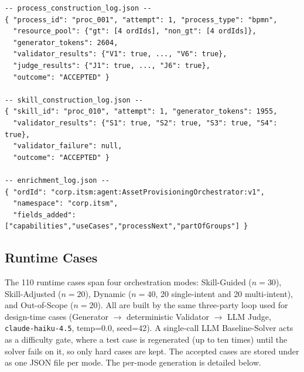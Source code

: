 \begin{lstlisting}[float=!t, floatplacement=!t, basicstyle=\ttfamily\scriptsize, breaklines=true, frame=single, label={lst:construction-logs}, caption={One representative entry from each of the three design-time construction logs. The skill and process logs record per-attempt validator results and acceptance outcome; the enrichment log records which fields were written per resource.}]
-- process_construction_log.json --
{ "process_id": "proc_001", "attempt": 1, "process_type": "bpmn",
  "resource_pool": {"gt": [4 ordIds], "non_gt": [4 ordIds]},
  "generator_tokens": 2604,
  "validator_results": {"V1": true, ..., "V6": true},
  "judge_results": {"J1": true, ..., "J6": true},
  "outcome": "ACCEPTED" }

-- skill_construction_log.json --
{ "skill_id": "proc_010", "attempt": 1, "generator_tokens": 1955,
  "validator_results": {"S1": true, "S2": true, "S3": true, "S4": true},
  "validator_failure": null,
  "outcome": "ACCEPTED" }

-- enrichment_log.json --
{ "ordId": "corp.itsm:agent:AssetProvisioningOrchestrator:v1",
  "namespace": "corp.itsm",
  "fields_added": ["capabilities","useCases","processNext","partOfGroups"] }
\end{lstlisting}









\subsection{Runtime Cases}
\label{appendix:rt-cases}

The 110 runtime cases span four orchestration modes: Skill-Guided ($n=30$), Skill-Adjusted ($n=20$), Dynamic ($n=40$, 20 single-intent and 20 multi-intent), and Out-of-Scope ($n=20$). All are built by the same three-party loop used for design-time cases (Generator $\to$ deterministic Validator $\to$ LLM Judge, \texttt{claude-haiku-4.5}, temp=0.0, seed=42). A single-call LLM Baseline-Solver acts as a difficulty gate, where a test case is regenerated (up to ten times) until the solver fails on it, so only hard cases are kept. The accepted cases are stored under  as one JSON file per mode. The per-mode generation is detailed below.

